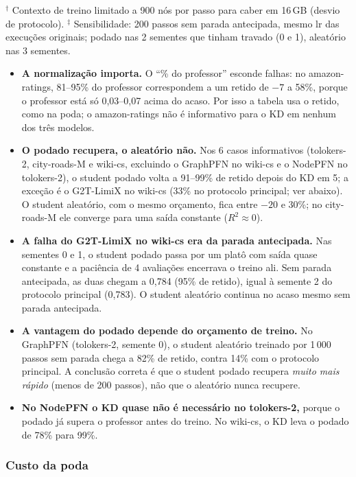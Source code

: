 \documentclass[12pt,a4paper]{article}
\begin{document}
\noindent $^\dagger$ Contexto de treino limitado a 900 nós por passo para caber em 16\,GB (desvio de protocolo). $^\ddagger$ Sensibilidade: 200 passos sem parada antecipada, mesmo lr das execuções originais; podado nas 2 sementes que tinham travado (0 e 1), aleatório nas 3 sementes.

\begin{itemize}
  \item \textbf{A normalização importa.} O ``\% do professor'' esconde falhas: no amazon-ratings, 81--95\% do professor correspondem a um retido de $-7$ a 58\%, porque o professor está só 0,03--0,07 acima do acaso. Por isso a tabela usa o retido, como na poda; o amazon-ratings não é informativo para o KD em nenhum dos três modelos.
  \item \textbf{O podado recupera, o aleatório não.} Nos 6 casos informativos (tolokers-2, city-roads-M e wiki-cs, excluindo o GraphPFN no wiki-cs e o NodePFN no tolokers-2), o student podado volta a 91--99\% de retido depois do KD em 5; a exceção é o G2T-LimiX no wiki-cs (33\% no protocolo principal; ver abaixo). O student aleatório, com o mesmo orçamento, fica entre $-20$ e 30\%; no city-roads-M ele converge para uma saída constante ($R^2 \approx 0$).
  \item \textbf{A falha do G2T-LimiX no wiki-cs era da parada antecipada.} Nas sementes 0 e 1, o student podado passa por um platô com saída quase constante e a paciência de 4 avaliações encerrava o treino ali. Sem parada antecipada, as duas chegam a 0,784 (95\% de retido), igual à semente 2 do protocolo principal (0,783). O student aleatório continua no acaso mesmo sem parada antecipada.
  \item \textbf{A vantagem do podado depende do orçamento de treino.} No GraphPFN (tolokers-2, semente 0), o student aleatório treinado por 1\,000 passos sem parada chega a 82\% de retido, contra 14\% com o protocolo principal. A conclusão correta é que o student podado recupera \emph{muito mais rápido} (menos de 200 passos), não que o aleatório nunca recupere.
  \item \textbf{No NodePFN o KD quase não é necessário no tolokers-2,} porque o podado já supera o professor antes do treino. No wiki-cs, o KD leva o podado de 78\% para 99\%.
\end{itemize}

\subsubsection{Custo da poda}
\end{document}
